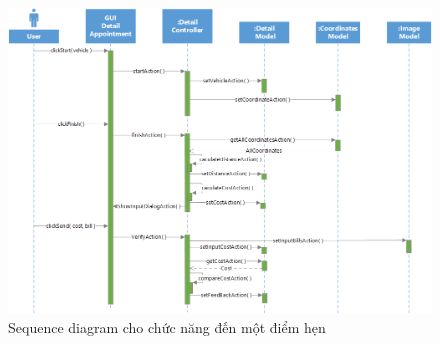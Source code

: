 \documentclass[a4paper]{article}
\begin{document}
\begin{figure}[!h]
    \includegraphics[width=13cm]{SequenceDiagram/Journey}
    \centering
    \caption{Sequence diagram cho chức năng đến một điểm hẹn}
    \label{fig:sequence_journey}
\end{figure}
\clearpage
\end{document}
